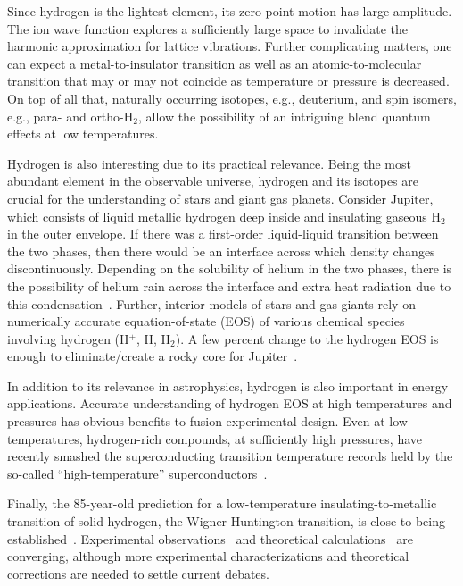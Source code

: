 Since hydrogen is the lightest element, its zero-point motion has large amplitude. The ion wave function explores a sufficiently large space to invalidate the harmonic approximation for lattice vibrations.
Further complicating matters, one can expect a metal-to-insulator transition as well as an atomic-to-molecular transition that may or may not coincide as temperature or pressure is decreased.
On top of all that, naturally occurring isotopes, e.g., deuterium, and spin isomers, e.g., para- and ortho-H$_2$, allow the possibility of an intriguing blend quantum effects at low temperatures.

Hydrogen is also interesting due to its practical relevance. Being the most abundant element in the observable universe, hydrogen and its isotopes are crucial for the understanding of stars and giant gas planets.
Consider Jupiter, which consists of liquid metallic hydrogen deep inside and insulating gaseous H$_2$ in the outer envelope. If there was a first-order liquid-liquid transition between the two phases, then there would be an interface across which density changes discontinuously.
Depending on the solubility of helium in the two phases, there is the possibility of helium rain across the interface and extra heat radiation due to this condensation~\cite{Militzer_thesis}.
Further, interior models of stars and gas giants rely on numerically accurate equation-of-state (EOS) of various chemical species involving hydrogen (H$^+$, H, H$_2$).
A few percent change to the hydrogen EOS is enough to eliminate/create a rocky core for Jupiter~\cite{Hubbard2016}.

In addition to its relevance in astrophysics, hydrogen is also important in energy applications. Accurate understanding of hydrogen EOS at high temperatures and pressures has obvious benefits to fusion experimental design.
Even at low temperatures, hydrogen-rich compounds, at sufficiently high pressures, have recently smashed the superconducting transition temperature records held by the so-called ``high-temperature'' superconductors~\cite{Drozdov2015,Errea2020}.

Finally, the 85-year-old prediction for a low-temperature insulating-to-metallic transition of solid hydrogen, the Wigner-Huntington transition, is close to being established~\cite{Wigner1935,Dias2016,Loubeyre2020}.
Experimental observations~\cite{Dias2016,Loubeyre2020} and theoretical calculations~\cite{McMinis2015,Gorelov2019} are converging, although more experimental characterizations and theoretical corrections are needed to settle current debates.

